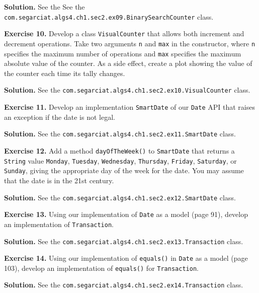 \documentclass[12pt, a4paper]{article}
\newenvironment{ex}[2][Exercise]
{\par\medskip\noindent \textbf{#1 #2.}}
{\medskip}
\newenvironment{sol}[1][Solution]
{\par\medskip\noindent \textbf{#1.} }
{\medskip}
\begin{document}
	\begin{sol}
		See the See the \texttt{com.segarciat.algs4.ch1.sec2.ex09.BinarySearchCounter} class.
	\end{sol}
	\begin{ex}{10}
		Develop a class \texttt{VisualCounter} that allows both increment and decrement
		operations. Take two arguments \texttt{n} and \texttt{max} in the constructor,
		where \texttt{n} specifies the maximum number of operations and \texttt{max} specifies
		the maximum absolute value of the counter. As a side effect, create a plot showing the
		value of the counter each time its tally changes.
	\end{ex}
	\begin{sol}
		See the \texttt{com.segarciat.algs4.ch1.sec2.ex10.VisualCounter} class.
	\end{sol}
	\begin{ex}{11}
		Develop an implementation \texttt{SmartDate} of our \texttt{Date} API that raises
		an exception if the date is not legal.
	\end{ex}
	\begin{sol}
		See the \texttt{com.segarciat.algs4.ch1.sec2.ex11.SmartDate} class.
	\end{sol}
	\begin{ex}{12}
		Add a method \texttt{dayOfTheWeek()} to \texttt{SmartDate} that returns a \texttt{String}
		value \texttt{Monday}, \texttt{Tuesday}, \texttt{Wednesday}, \texttt{Thursday},
		\texttt{Friday}, \texttt{Saturday}, or \texttt{Sunday}, giving the appropriate
		day of the week for the date. You may assume that the date is in the 21st  century.
	\end{ex}
	\begin{sol}
		See the \texttt{com.segarciat.algs4.ch1.sec2.ex12.SmartDate} class.
	\end{sol}
	\begin{ex}{13}
		Using our implementation of \texttt{Date} as a model (page 91), develop an implementation
		of \texttt{Transaction}.
	\end{ex}
	\begin{sol}
		See the \texttt{com.segarciat.algs4.ch1.sec2.ex13.Transaction} class.
	\end{sol}
	\begin{ex}{14}
		Using our implementation of \texttt{equals()} in \texttt{Date} as a model (page 103),
		develop an implementation of \texttt{equals()} for \texttt{Transaction}.
	\end{ex}
	\begin{sol}
		See the \texttt{com.segarciat.algs4.ch1.sec2.ex14.Transaction} class.
	\end{sol}
\end{document}
